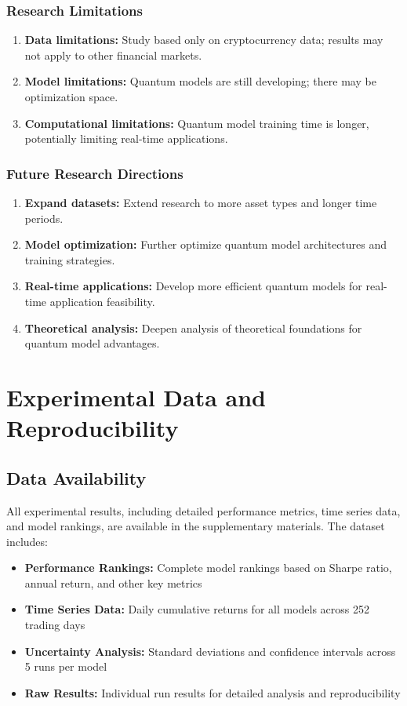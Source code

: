 \documentclass[12pt,a4paper]{article}
\begin{document}
\subsubsection{Research Limitations}

\begin{enumerate}
    \item \textbf{Data limitations:} Study based only on cryptocurrency data; results may not apply to other financial markets.
    \item \textbf{Model limitations:} Quantum models are still developing; there may be optimization space.
    \item \textbf{Computational limitations:} Quantum model training time is longer, potentially limiting real-time applications.
\end{enumerate}

\subsubsection{Future Research Directions}

\begin{enumerate}
    \item \textbf{Expand datasets:} Extend research to more asset types and longer time periods.
    \item \textbf{Model optimization:} Further optimize quantum model architectures and training strategies.
    \item \textbf{Real-time applications:} Develop more efficient quantum models for real-time application feasibility.
    \item \textbf{Theoretical analysis:} Deepen analysis of theoretical foundations for quantum model advantages.
\end{enumerate}

\section{Experimental Data and Reproducibility}

\subsection{Data Availability}

All experimental results, including detailed performance metrics, time series data, and model rankings, are available in the supplementary materials. The dataset includes:

\begin{itemize}
    \item \textbf{Performance Rankings:} Complete model rankings based on Sharpe ratio, annual return, and other key metrics
    \item \textbf{Time Series Data:} Daily cumulative returns for all models across 252 trading days
    \item \textbf{Uncertainty Analysis:} Standard deviations and confidence intervals across 5 runs per model
    \item \textbf{Raw Results:} Individual run results for detailed analysis and reproducibility
\end{itemize}
\end{document}
